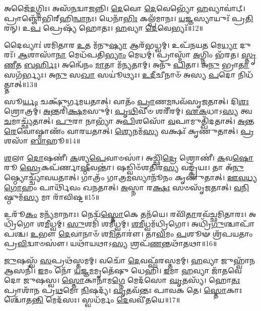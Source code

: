 𑌅𑌜𑍈᳴\-\ul{𑌦}\-𑌗𑍍𑌨𑌿𑌃।
𑌅𑌸᳴\-\ul{𑌨}\-𑌦𑍍𑌵𑌾\-\ul{𑌜}\-𑌨𑍍𑌨𑌿।
\-\ul{𑌦𑍇}\-𑌵𑍋 \ul{𑌦𑍇}\-𑌵𑍇𑌭𑍍𑌯𑍋᳴ \ul{𑌹}\-𑌵𑍍𑌯𑌾𑌵𑌾॑𑌟𑍍।
𑌪𑍍𑌰𑌾𑌞𑍍𑌜𑍋᳴𑌭𑌿𑌰𑍍‌\mbox{}𑌹𑌿\-\ul{𑌨𑍍𑌵𑌾}\-𑌨𑌃।
𑌧𑍇𑌨𑌾᳴\-\ul{𑌭𑌿𑌃} 𑌕𑌲𑍍𑌪᳴𑌮𑌾𑌨𑌃।
\-\ul{𑌯}\-𑌜𑍍𑌞𑌸𑍍𑌯𑌾𑌯𑍁𑌃᳴ 𑌪𑍍𑌰\-\ul{𑌤𑌿}\-𑌰𑌨𑍍।
𑌉\-\ul{𑌪} 𑌪𑍍𑌰𑍇𑌷𑍍𑌯᳴ 𑌹𑍋𑌤𑌃।
\-\ul{𑌹}\-𑌵𑍍𑌯𑌾 \ul{𑌦𑍇}\-𑌵𑍇𑌭𑍍𑌯𑌃᳴॥12॥\anuvakamend[𑌅𑌜𑍈᳴\-\ul{𑌦}\-𑌷𑍍𑌟𑍗]

𑌦𑍈𑌵𑍍𑌯𑌾𑌃॑ 𑌶𑌮𑌿𑌤𑌾𑌰 \ul{𑌉}\-𑌤 𑌮᳴𑌨𑍁\-\ul{𑌷𑍍𑌯𑌾} 𑌆𑌰᳴𑌭𑌧𑍍𑌵𑌮𑍍।
𑌉𑌪᳴𑌨𑌯\-\ul{𑌤} 𑌮𑍇\-\ul{𑌧𑍍𑌯𑌾} 𑌦𑍁𑌰𑌃᳴।
\-\ul{𑌆}\-𑌶𑌾𑌸𑌾᳴\-\ul{𑌨𑌾} 𑌮𑍇𑌧᳴𑌪𑌤𑌿\-\ul{𑌭𑍍𑌯𑌾𑌂} 𑌮𑍇𑌧𑌮𑍍॑।
𑌪𑍍𑌰𑌾𑌸𑍍𑌮𑌾᳴ \ul{𑌅}\-𑌗𑍍𑌨𑌿𑌂 𑌭᳴𑌰𑌤।
\-\ul{𑌸𑍍𑌤𑍃}\-\-\ul{𑌣𑍀}\-𑌤 \ul{𑌬}\-\-\ul{𑌰𑍍}\-𑌹𑌿𑌃।
𑌅𑌨𑍍𑌵𑍇᳴𑌨𑌂 \ul{𑌮𑌾}\-𑌤𑌾 𑌮᳴𑌨𑍍𑌯𑌤𑌾𑌮𑍍।
𑌅𑌨𑍁᳴ \ul{𑌪𑌿}\-𑌤𑌾।
𑌅\-\ul{𑌨𑍁} 𑌭𑍍𑌰𑌾\-\ul{𑌤𑌾} 𑌸𑌗᳴𑌰𑍍𑌭𑍍𑌯𑌃।
𑌅\-\ul{𑌨𑍁} 𑌸\-\ul{𑌖𑌾} 𑌸𑌯𑍂॑𑌥𑍍𑌯𑌃।
\-\ul{𑌉}\-\-\ul{𑌦𑍀}\-𑌚𑍀𑌨𑌾𑍞᳴ 𑌅𑌸𑍍𑌯 \ul{𑌪}\-𑌦𑍋 𑌨𑌿𑌧᳴𑌤𑍍𑌤𑌾𑌤𑍍॥13॥

𑌸𑍂\-\ul{𑌰𑍍𑌯𑌂} 𑌚𑌕𑍍𑌷𑍁᳴𑌰𑍍𑌗𑌮𑌯𑌤𑌾𑌤𑍍।
𑌵𑌾𑌤𑌂᳴ \ul{𑌪𑍍𑌰𑌾}\-𑌣\-\ul{𑌮}\-𑌨𑍍𑌵𑌵᳴\-𑌸𑍃𑌜𑌤𑌾𑌤𑍍।
𑌦𑌿\-\ul{𑌶𑌃} 𑌶𑍍𑌰𑍋𑌤𑍍𑌰𑌮𑍍॑।
\-\ul{𑌅}\-𑌨𑍍𑌤𑌰𑌿᳴\-\ul{𑌕𑍍𑌷}\-𑌮𑌸𑍁𑌮𑍍॑।
\-\ul{𑌪𑍃}\-\-\ul{𑌥𑌿}\-𑌵𑍀𑍞 𑌶𑌰𑍀᳴𑌰𑌮𑍍।
\-\ul{𑌏}\-\-\ul{𑌕}\-𑌧𑌾\-𑌽\-\ul{𑌸𑍍𑌯} 𑌤𑍍𑌵\-\ul{𑌚}\-𑌮𑌾𑌚𑍍𑌛𑍍𑌯᳴𑌤𑌾𑌤𑍍।
\-\ul{𑌪𑍁}\-𑌰𑌾 𑌨𑌾𑌭𑍍𑌯𑌾᳴ 𑌅\-\ul{𑌪𑌿}\-𑌶𑌸𑍋᳴ \ul{𑌵}\-𑌪𑌾𑌮𑍁𑌤𑍍𑌖𑌿᳴𑌦𑌤𑌾𑌤𑍍।
\-\ul{𑌅}\-𑌨𑍍𑌤\-\ul{𑌰𑍇}\-𑌵𑍋𑌷𑍍𑌮𑌾𑌣𑌂᳴ 𑌵𑌾𑌰𑌯𑌤𑌾𑌤𑍍।
\-\ul{𑌶𑍍𑌯𑍇}\-𑌨𑌮᳴\-\ul{𑌸𑍍𑌯} 𑌵𑌕𑍍𑌷𑌃᳴ 𑌕𑍃𑌣𑍁𑌤𑌾𑌤𑍍।
\-\ul{𑌪𑍍𑌰}\-𑌶𑌸𑌾᳴ \ul{𑌬𑌾}\-𑌹𑍂॥14॥

\-\ul{𑌶}\-𑌲𑌾 \ul{𑌦𑍋}\-𑌷𑌣𑍀॑।
\-\ul{𑌕}\-𑌶𑍍𑌯\-\ul{𑌪𑍇}\-𑌵𑌾𑍞𑌸𑌾॑।
𑌅𑌚𑍍𑌛𑌿᳴\-\ul{𑌦𑍍𑌰𑍇} 𑌶𑍍𑌰𑍋𑌣𑍀॑।
\-\ul{𑌕}\-𑌵\-\ul{𑌷𑍋}\-𑌰𑍂 \ul{𑌸𑍍𑌰𑍇}\-𑌕𑌪᳴𑌰𑍍𑌣𑌾\-\ul{𑌷𑍍𑌠𑍀}\-𑌵𑌨𑍍𑌤𑌾॑।
𑌷𑌡𑍍𑌵𑌿𑍞᳴𑌶𑌤𑌿𑌰\-\ul{𑌸𑍍𑌯} 𑌵𑌙𑍍𑌕𑍍𑌰᳴𑌯𑌃।
𑌤𑌾 𑌅᳴\-\ul{𑌨𑍁}\-𑌷𑍍𑌠𑍍𑌯𑍋𑌚𑍍𑌚𑍍𑌯𑌾᳴𑌵𑌯𑌤𑌾𑌤𑍍।
𑌗𑌾𑌤𑍍𑌰𑌂᳴ 𑌗𑌾𑌤𑍍𑌰\-\ul{𑌮}\-𑌸𑍍𑌯𑌾𑌨𑍂᳴𑌨𑌂 𑌕𑍃𑌣𑍁𑌤𑌾𑌤𑍍।
\-\ul{𑌊}\-\-\ul{𑌵}\-\-\ul{𑌧𑍍𑌯}\-\-\ul{𑌗𑍋}\-𑌹𑌂 𑌪𑌾𑌰𑍍𑌥𑌿᳴𑌵𑌂 𑌖𑌨𑌤𑌾𑌤𑍍।
\-\ul{𑌅}\-𑌸𑍍𑌨𑌾 𑌰\-\ul{𑌕𑍍𑌷𑌃} 𑌸𑍞𑌸𑍃᳴𑌜𑌤𑌾𑌤𑍍।
\-\ul{𑌵}\-\-\ul{𑌨𑌿}\-𑌷𑍍𑌠𑍁𑌮᳴\-\ul{𑌸𑍍𑌯} 𑌮𑌾 𑌰𑌾᳴𑌵𑌿𑌷𑍍𑌟॥15॥

𑌉𑌰𑍂᳴\-\ul{𑌕𑌂} 𑌮𑌨𑍍𑌯᳴𑌮𑌾𑌨𑌾𑌃।
𑌨𑍇𑌦𑍍𑌵᳴\-\ul{𑌸𑍍𑌤𑍋}\-𑌕𑍇 𑌤𑌨᳴𑌯𑍇।
𑌰𑌵𑌿᳴\-\ul{𑌤𑌾}\-𑌰𑌵᳴𑌚𑍍𑌛𑌮𑌿𑌤𑌾𑌰𑌃।
𑌅𑌧𑍍𑌰𑌿᳴𑌗𑍋 𑌶\-\ul{𑌮𑍀}\-𑌧𑍍𑌵𑌮𑍍।
\-\ul{𑌸𑍁}\-𑌶𑌮𑌿᳴ 𑌶𑌮𑍀𑌧𑍍𑌵𑌮𑍍।
\-\ul{𑌶}\-\-\ul{𑌮𑍀}\-𑌧𑍍𑌵𑌮᳴𑌧𑍍𑌰𑌿𑌗𑍋।
𑌅𑌧𑍍𑌰𑌿᳴\-\ul{𑌗𑍁}\-𑌶𑍍𑌚𑌾𑌪𑌾᳴𑌪𑌶𑍍𑌚।
\-\ul{𑌉}\-𑌭𑍗 \ul{𑌦𑍇}\-𑌵𑌾𑌨𑌾𑍞᳴ 𑌶\-\ul{𑌮𑌿}\-𑌤𑌾𑌰𑍗॑।
𑌤𑌾\-\ul{𑌵𑌿}\-𑌮𑌂 \ul{𑌪}\-𑌶𑍂𑍟 𑌶𑍍𑌰᳴𑌪𑌯𑌤𑌾𑌂 𑌪𑍍𑌰\-\ul{𑌵𑌿}\-𑌦𑍍𑌵𑌾𑍞𑌸𑍗॑।
𑌯𑌥𑌾᳴𑌯𑌥𑌾\-𑌽\-\ul{𑌸𑍍𑌯} 𑌶𑍍𑌰𑌪᳴\-\ul{𑌣}\-𑌨𑍍𑌤𑌥𑌾᳴𑌤𑌥𑌾॥16॥\anuvakamend[\-\ul{𑌧}\-\-\ul{𑌤𑍍𑌤𑌾}\-\-\ul{𑌦𑍍𑌬𑌾}\-𑌹𑍂 𑌮𑌾 𑌰𑌾᳴𑌵𑌿\-\ul{𑌷𑍍𑌟} 𑌤𑌥𑌾᳴𑌤𑌥𑌾]

\-\ul{𑌜𑍁}\-𑌷𑌸𑍍𑌵᳴ \ul{𑌸}\-𑌪𑍍𑌰𑌥᳴𑌸𑍍𑌤𑌮𑌮𑍍।
𑌵𑌚𑍋᳴ \ul{𑌦𑍇}\-𑌵𑌫𑍍𑌸᳴𑌰𑌸𑍍𑌤𑌮𑌮𑍍।
\-\ul{𑌹}\-𑌵𑍍𑌯𑌾 𑌜𑍁𑌹𑍍𑌵𑌾᳴𑌨 \ul{𑌆}\-𑌸𑌨𑌿᳴।
\-\ul{𑌇}\-𑌮𑌂 𑌨𑍋᳴ \ul{𑌯}\-𑌜𑍍𑌞\-\ul{𑌮}\-𑌮𑍃𑌤𑍇᳴𑌷𑍁 𑌧𑍇𑌹𑌿।
\-\ul{𑌇}\-𑌮𑌾 \ul{𑌹}\-𑌵𑍍𑌯𑌾 𑌜𑌾᳴𑌤𑌵𑍇𑌦𑍋 𑌜𑍁𑌷𑌸𑍍𑌵।
\-\ul{𑌸𑍍𑌤𑍋}\-𑌕𑌾𑌨𑌾᳴𑌮\-\ul{𑌗𑍍𑌨𑍇} 𑌮𑍇𑌦᳴𑌸𑍋 \ul{𑌘𑍃}\-𑌤𑌸𑍍𑌯᳴।
𑌹𑍋\-\ul{𑌤𑌃} 𑌪𑍍𑌰𑌾𑌶𑌾᳴𑌨 𑌪𑍍𑌰\-\ul{𑌥}\-𑌮𑍋 \ul{𑌨𑌿}\-𑌷𑌦𑍍𑌯᳴।
\-\ul{𑌘𑍃}\-𑌤𑌵᳴𑌨𑍍𑌤𑌃 𑌪𑌾𑌵𑌕 𑌤𑍇।
\-\ul{𑌸𑍍𑌤𑍋}\-𑌕𑌾𑌃 𑌶𑍍𑌚𑍋᳴𑌤\-\ul{𑌨𑍍𑌤𑌿} 𑌮𑍇𑌦᳴𑌸𑌃।
𑌸𑍍𑌵𑌧᳴𑌰𑍍𑌮𑌂 \ul{𑌦𑍇}\-𑌵𑌵𑍀᳴𑌤𑌯𑍇॥17॥

